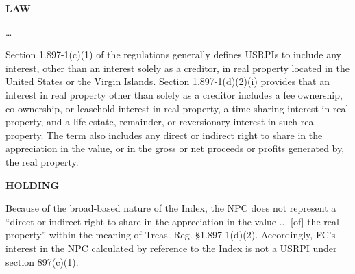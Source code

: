 \begin{select}
\begin{center} \textbf{LAW}
\end{center} 
   \ldots

Section 1.897-1(c)(1) of the regulations generally defines USRPIs to include any 
interest, other than an interest solely as a creditor, in real property located in the United 
States or the Virgin Islands. Section 1.897-1(d)(2)(i) provides that an interest in real 
property other than solely as a creditor includes a fee ownership, co-ownership, or 
leasehold interest in real property, a time sharing interest in real property, and a life 
estate, remainder, or reversionary interest in such real property. The term also includes 
any direct or indirect right to share in the appreciation in the value, or in the gross or net 
proceeds or profits generated by, the real property.  
\begin{center} \textbf{HOLDING}
\end{center} 

Because of the broad-based nature of the Index, the NPC does not represent a 
``direct or indirect right to share in the appreciation in the value ... [of] the real property'' 
within the meaning of Treas. Reg. \S1.897-1(d)(2). Accordingly, FC's interest in the NPC 
calculated by reference to the Index is not a USRPI under section 897(c)(1). 

\end{select}
 
